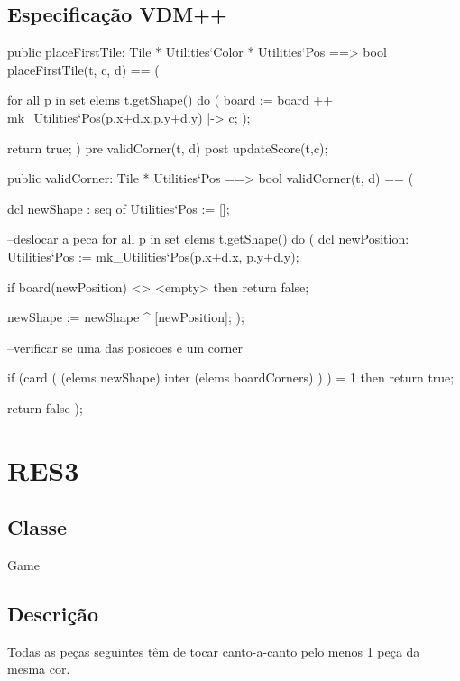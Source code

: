 \subsection{Especificação VDM++}
\begin{vdm_al}
public placeFirstTile: Tile * Utilities`Color * Utilities`Pos ==> bool 
  placeFirstTile(t, c, d) == ( 
     
      for all p in set elems t.getShape() do (   
        board := board ++ {mk_Utilities`Pos(p.x+d.x,p.y+d.y) |-> c}; 
      ); 

    return true; 
  ) 
  pre validCorner(t, d) 
  post updateScore(t,c);

  public validCorner: Tile * Utilities`Pos ==> bool
    validCorner(t, d) == (
      
  dcl newShape : seq of Utilities`Pos := [];

  --deslocar a peca
  for all p in set elems t.getShape() do (
    dcl newPosition: Utilities`Pos := mk_Utilities`Pos(p.x+d.x, p.y+d.y);
        
        if board(newPosition) <> <empty> then
          return false;
          
      newShape := newShape ^ [newPosition];
      );
      
    --verificar se uma das posicoes e um corner
    
      if (card ( (elems newShape) inter (elems boardCorners) ) ) = 1 then
        return true;

      return false
    );
\end{vdm_al}

\section{RES3}
\subsection{Classe}
Game
\subsection{Descrição}
Todas as peças seguintes têm de tocar canto-a-canto pelo menos 1 peça da mesma cor.
